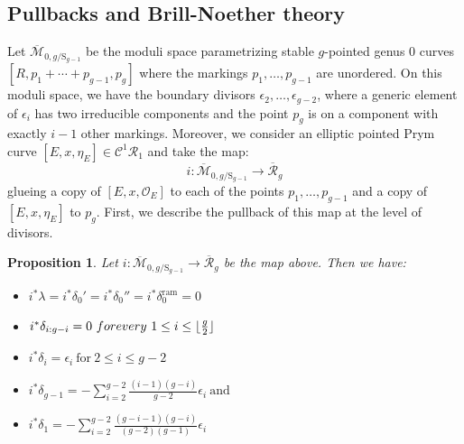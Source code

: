 \documentclass{article}
\DeclarePairedDelimiter\floor{\lfloor}{\rfloor}
\theoremstyle{plain}
\newtheorem{prop}[trm]{Proposition}
\theoremstyle{definition}
\def\mzero{\mm_{0,g/\mathrm{S}_{g-1}}}
\def\OO{\mathcal{O}}
\def\cC{\mathcal{C}}
\def\cR{\mathcal{R}}
\def\rr{\overline{\mathcal{R}}}
\def\cC{\mathcal{C}}
\def\mm{\overline{\mathcal{M}}}
\begin{document}
\subsection{Pullbacks and Brill-Noether theory}
Let $\mm_{0,g/\mathrm{S}_{g-1}}$ be the moduli space parametrizing stable $g$-pointed genus 0 curves $[R, p_1+\cdots+p_{g-1}, p_g]$ where the markings $p_1,\ldots, p_{g-1}$ are unordered. On this moduli space, we have the boundary divisors $\epsilon_2,\ldots, \epsilon_{g-2}$, where a generic element of $\epsilon_i$ has two irreducible components and the point $p_g$ is on a component with exactly $i-1$ other markings. Moreover, we consider an elliptic pointed Prym curve $[E,x,\eta_E] \in \cC^1\cR_1$ and take the map: 
\[ i \colon \mzero \rightarrow \rr_g   \]
glueing a copy of $[E,x,\OO_E]$ to each of the points $p_1,\ldots, p_{g-1}$ and a copy of $[E,x,\eta_E]$ to $p_g$. First, we describe the pullback of this map at the level of divisors. 
\begin{prop} \label{Picardmap} Let $ i \colon \mzero \rightarrow \rr_g $ be the map above. Then we have:
	\begin{itemize}
		\item $ i^*\lambda = i^*\delta_0'=i^*\delta_0'' =i^*\delta^{\mathrm{ram}}_0 = 0$
		\item $i^*\delta_{i:g-i} = 0 \ \textrm{for every} \ 1\leq i \leq \floor{\frac{g}{2}}$
		\item  $i^*\delta_i = \epsilon_i \ \textrm{for} \ 2\leq i \leq g-2$
		\item $i^*\delta_{g-1} = -\sum^{g-2}_{i=2}\frac{(i-1)(g-i)}{g-2}\epsilon_i \ \textrm{and}$
		\item $i^*\delta_1 = - \sum_{i=2}^{g-2}\frac{(g-i-1)(g-i)}{(g-2)(g-1)}\epsilon_i$
	\end{itemize}
\end{prop}
\end{document}
